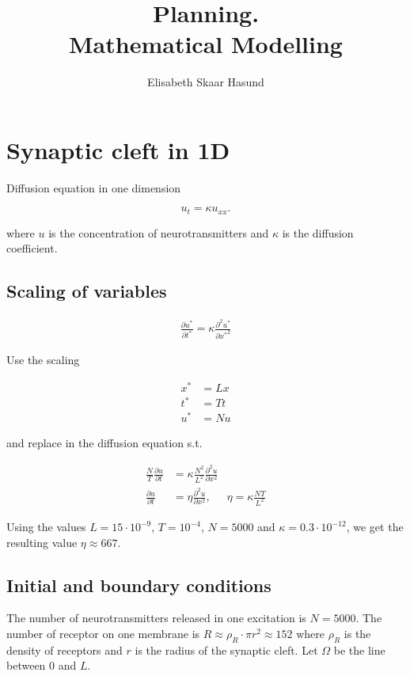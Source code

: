 \documentclass{article}
\title{Planning. \\ Mathematical Modelling }
\author{Elisabeth Skaar Hasund}
\begin{document}
\maketitle

\section*{Synaptic cleft in 1D}

Diffusion equation in one dimension

\begin{equation}
u_t = \kappa u_{xx}.
\end{equation}

where $u$ is the concentration of neurotransmitters and $\kappa$ is the diffusion coefficient.

\subsection*{Scaling of variables}

\begin{align*}
\frac{\partial u^*}{\partial t^*} = \kappa \frac{\partial^2u^*}{\partial {x^*}^2}
\end{align*}

Use the scaling 

\begin{align*}
x^* &= L x \\
t^* &= T t \\
u^* &= N u 
\end{align*}

and replace in the diffusion equation s.t.

\begin{align*}
\frac{N}{T}\frac{\partial u}{\partial t} &= \kappa \frac{N^2}{L^2}\frac{\partial^2u}{\partial x^2} \\
\frac{\partial u}{\partial t} &= \eta \frac{\partial^2u}{\partial x^2}, & \eta = \kappa\frac{NT}{L^2}
\end{align*}

Using the values $L = 15 \cdot 10^{-9}$, $T = 10^{-4}$, $N = 5000$ and $\kappa = 0.3\cdot 10^{-12}$, we get the resulting value $\eta \approx 667$. 



\subsection*{Initial and boundary conditions}

The number of neurotransmitters released in one excitation is $N = 5000$. The number of receptor on one membrane is $R \approx \rho_R \cdot \pi r^2 \approx 152$ where $\rho_R$ is the density of receptors and $r$ is the radius of the synaptic cleft. Let $\Omega$ be the line between $0$ and $L$.
\end{document}
